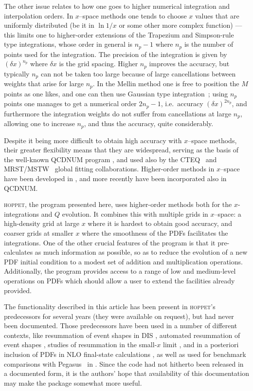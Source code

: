 \documentclass[12pt]{article}
\newcommand{\lp}{\left(}
\newcommand{\rp}{\right)}
\newcommand{\ie}{i.e.\ }
\newcommand{\hoppet}{\textsc{hoppet}\xspace}
\begin{document}
The other issue relates to how one goes to higher numerical
integration and interpolation orders.
In $x$--space methods one tends to choose $x$ values that are uniformly
distributed (be it in $\ln 1/x$ or some other more complex function)
--- this limits one to higher-order extensions of the Trapezium and
Simpson-rule type integrations, whose order in general is $n_p-1$
where $n_p$ is the number of points used for the integration. The
precision of the integration is given by $\lp\delta x\rp^{n_p}$ where
$\delta x$ is the grid spacing. Higher $n_p$ improves the accuracy,
but typically $n_p$ can not be taken too large because of large
cancellations between weights that arise for large $n_p$.
%
%
In the Mellin method one is free to position the $M$ points as one
likes, and one can then use Gaussian type
integration~\cite{Weinzierl:2002mv,Pegasus,Kosower:1997hg}; using $n_p$
points one manages to get a numerical order $2n_p-1$, \ie accuracy
$\lp \delta x\rp^{2n_p}$, and furthermore the integration weights do not suffer
from cancellations at large $n_p$, allowing one to increase
$n_p$, and thus the accuracy, quite considerably.

Despite it being more difficult to obtain high accuracy with $x$--space
methods, their greater flexibility means that they are widespread,
serving as the basis of the well-known  QCDNUM program \cite{Botje},
and  used also by the CTEQ~\cite{CTEQ} and MRST/MSTW~\cite{MRST}
global fitting
collaborations. Higher-order methods in $x$--space have been developed
in \cite{Schoeffel:1998tz,Pascaud:2001bi,coriano,GuzziThesis,DisResum}, and
more recently have been incorporated also in QCDNUM.

\hoppet, the program presented here, uses higher-order methods both for
the $x$-integrations and $Q$ evolution. It combines this with multiple
grids in $x$--space: a high-density grid at large $x$ where it is
hardest to obtain good accuracy, and coarser grids at smaller $x$
where the smoothness of the PDFs facilitates the integrations. One of
the other crucial features of the program is that it pre-calculates as
much information as possible, so as to reduce the 
evolution of a new PDF initial condition to a modest set of addition
and multiplication operations. Additionally, the program provides
access to a range of low and medium-level operations on PDFs which
should allow a user to extend the facilities already provided.


The functionality described in this article has been present in
\hoppet's predecessors for several years (they were available on
request), but had
never been documented. 
Those predecessors have  been used in a number of different
contexts, like resummation of event shapes
in DIS \cite{DisResum}, automated resummation
of event shapes \cite{caesar}, studies of
resummation in the small-$x$ limit \cite{Ciafaloni:2003rd}, 
and in a posteriori inclusion
of PDFs in NLO final-state calculations \cite{APPL,Banfi:2007gu}, as well
as  used for benchmark
comparisons with Pegasus~\cite{Pegasus} in \cite{Benchmarks}.
Since the code had
not hitherto been released in a documented form, 
it is the authors' hope that availability of
this documentation may make the package somewhat more useful.
\end{document}
